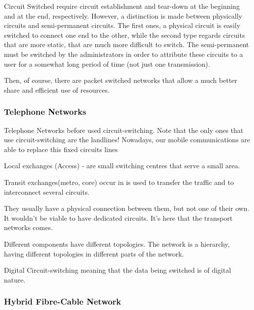 Circuit Switched require circuit establishment and tear-down at the beginning and at the end, respectively. However, a distinction is made between physically  circuits and semi-permanent circuits. The first ones, a physical circuit is easily switched to connect one end to the other, while the second type regards circuits that are more static, that are much more difficult to switch. The semi-permanent must be switched by the administrators in order to attribute these circuits to a user for a somewhat long period of time (not just one transmission).

Then, of course, there are packet switched networks that allow a much better share and efficient use of resources.




\subsubsection*{Telephone Networks}
Telephone Networks before used circuit-switching. Note that the only ones that use circuit-switching are the landlines! Nowadays, our mobile communications are able to replace this fixed circuits lines

Local exchanges (Access) - are small switching centres that serve a small area.

Transit exchanges(metro, core) occur in  is used to transfer the traffic and to interconnect several circuits.

They usually have a physical connection between them, but not one of their own. It wouldn't be viable to have dedicated circuits. It's here that the transport networks comes.

Different components have different topologies. The network is a hierarchy, having different topologies in different parts of the network.

Digital Circuit-switching meaning that the data being switched is of digital nature.



\subsubsection*{Hybrid Fibre-Cable Network}


